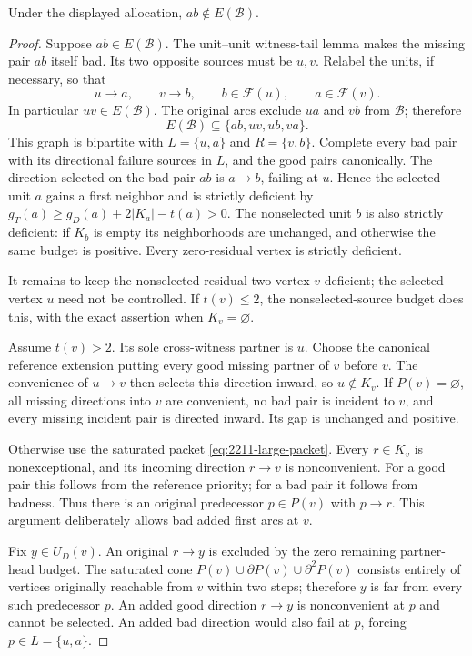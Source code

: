 \begin{lemma}
\label{lem:2211-no-unit-unit-witness}
Under the displayed allocation, $ab\notin E(\mathcal B)$.
\end{lemma}
\begin{proof}
Suppose $ab\in E(\mathcal B)$. The unit--unit witness-tail lemma
makes the missing pair $ab$ itself bad. Its two opposite sources
must be $u,v$. Relabel the units, if necessary, so that
\[
 u\to a,\qquad v\to b,\qquad
 b\in\mathcal F(u),\qquad a\in\mathcal F(v).
 \tag{2211-2}\label{eq:2211-unit-unit-original}
\]
In particular $uv\in E(\mathcal B)$.
The original arcs exclude $ua$ and $vb$ from $\mathcal B$;
therefore
\[
 E(\mathcal B)\subseteq\{ab,uv,ub,va\}.
\]
This graph is bipartite with
$L=\{u,a\}$ and $R=\{v,b\}$.
Complete every bad pair with its directional failure sources in $L$,
and the good pairs canonically. The direction selected on the bad
pair $ab$ is $a\to b$, failing at $u$.
Hence the selected unit $a$ gains a first neighbor and is strictly
deficient by
$g_T(a)\ge g_D(a)+2|K_a|-t(a)>0$.
The nonselected unit $b$ is also strictly deficient: if $K_b$ is
empty its neighborhoods are unchanged, and otherwise the same
budget is positive. Every zero-residual vertex is strictly deficient.

It remains to keep the nonselected residual-two vertex $v$ deficient;
the selected vertex $u$ need not be controlled. If $t(v)\le2$,
the nonselected-source budget does this, with the exact assertion
when $K_v=\varnothing$.

Assume $t(v)>2$. Its sole cross-witness partner is $u$.
Choose the canonical reference extension putting every good missing
partner of $v$ before $v$. The convenience of $u\to v$ then
selects this direction inward, so $u\notin K_v$.
If $P(v)=\varnothing$, all missing directions into $v$ are
convenient, no bad pair is incident to $v$, and every missing
incident pair is directed inward. Its gap is unchanged and positive.

Otherwise use the saturated packet \eqref{eq:2211-large-packet}.
Every $r\in K_v$ is nonexceptional, and its incoming direction
$r\to v$ is nonconvenient. For a good pair this follows from
the reference priority; for a bad pair it follows from badness.
Thus there is an original predecessor $p\in P(v)$ with $p\to r$.
This argument deliberately allows bad added first arcs at $v$.

Fix $y\in U_D(v)$. An original $r\to y$ is excluded by the
zero remaining partner-head budget. The saturated cone
$P(v)\cup\partial P(v)\cup\partial^2P(v)$ consists entirely
of vertices originally reachable from $v$ within two steps;
therefore $y$ is far from every such predecessor $p$.
An added good direction $r\to y$ is nonconvenient at $p$ and
cannot be selected. An added bad direction would also fail at $p$,
forcing $p\in L=\{u,a\}$.


\end{proof}
